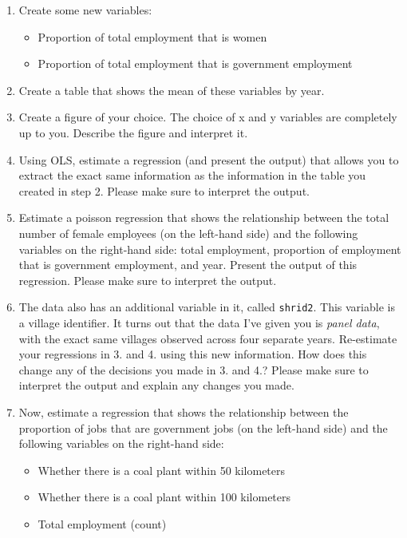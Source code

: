 \documentclass[
]{article}
\providecommand{\tightlist}{%
  \setlength{\itemsep}{0pt}\setlength{\parskip}{0pt}}
\begin{document}
\begin{enumerate}
\def\labelenumi{\arabic{enumi}.}
\tightlist
\item
  Create some new variables:

  \begin{itemize}
  \tightlist
  \item
    Proportion of total employment that is women
  \item
    Proportion of total employment that is government employment
  \end{itemize}
\item
  Create a table that shows the mean of these variables by year.
\item
  Create a figure of your choice. The choice of x and y variables are completely up to you. Describe the figure and interpret it.
\item
  Using OLS, estimate a regression (and present the output) that allows you to extract the exact same information as the information in the table you created in step 2. Please make sure to interpret the output.
\item
  Estimate a poisson regression that shows the relationship between the total number of female employees (on the left-hand side) and the following variables on the right-hand side: total employment, proportion of employment that is government employment, and year. Present the output of this regression. Please make sure to interpret the output.
\item
  The data also has an additional variable in it, called \texttt{shrid2}. This variable is a village identifier. It turns out that the data I've given you is \emph{panel data}, with the exact same villages observed across four separate years. Re-estimate your regressions in 3. and 4. using this new information. How does this change any of the decisions you made in 3. and 4.? Please make sure to interpret the output and explain any changes you made.
\item
  Now, estimate a regression that shows the relationship between the proportion of jobs that are government jobs (on the left-hand side) and the following variables on the right-hand side:

  \begin{itemize}
  \tightlist
  \item
    Whether there is a coal plant within 50 kilometers
  \item
    Whether there is a coal plant within 100 kilometers
  \item
    Total employment (count)
  \end{itemize}
\end{enumerate}
\end{document}
